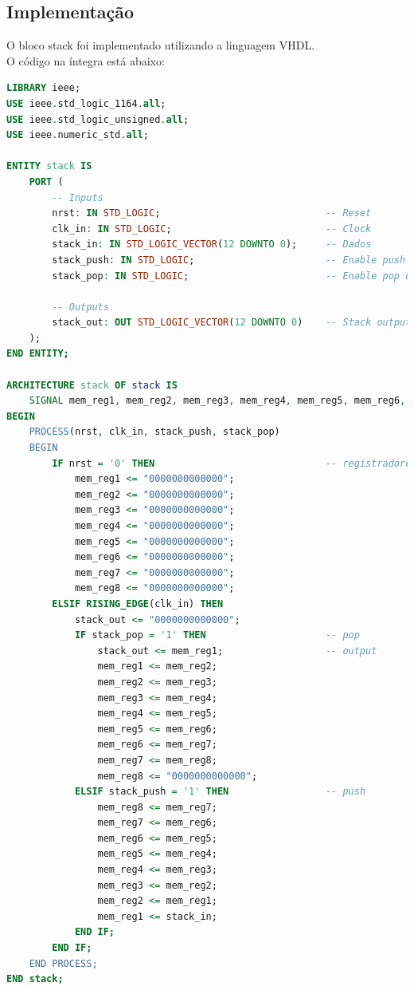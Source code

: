 \documentclass{article}
\begin{document}
\subsection{Implementação}

O bloco stack foi implementado utilizando a linguagem VHDL.\\

O código na íntegra está abaixo:\\

\begin{lstlisting}[language=VHDL, caption={Código VHDL stack}]
LIBRARY ieee;
USE ieee.std_logic_1164.all;
USE ieee.std_logic_unsigned.all;
USE ieee.numeric_std.all;

ENTITY stack IS
    PORT (
        -- Inputs
        nrst: IN STD_LOGIC;                             -- Reset
        clk_in: IN STD_LOGIC;                           -- Clock
        stack_in: IN STD_LOGIC_VECTOR(12 DOWNTO 0);     -- Dados
        stack_push: IN STD_LOGIC;                       -- Enable push op
        stack_pop: IN STD_LOGIC;                        -- Enable pop op
        
        -- Outputs
        stack_out: OUT STD_LOGIC_VECTOR(12 DOWNTO 0)    -- Stack output
    );
END ENTITY;

ARCHITECTURE stack OF stack IS
    SIGNAL mem_reg1, mem_reg2, mem_reg3, mem_reg4, mem_reg5, mem_reg6, mem_reg7, mem_reg8 : STD_LOGIC_VECTOR(12 DOWNTO 0);
BEGIN
    PROCESS(nrst, clk_in, stack_push, stack_pop)
    BEGIN
        IF nrst = '0' THEN                              -- registradores
            mem_reg1 <= "0000000000000";
            mem_reg2 <= "0000000000000";
            mem_reg3 <= "0000000000000";
            mem_reg4 <= "0000000000000";
            mem_reg5 <= "0000000000000";
            mem_reg6 <= "0000000000000";
            mem_reg7 <= "0000000000000";
            mem_reg8 <= "0000000000000";
        ELSIF RISING_EDGE(clk_in) THEN
			stack_out <= "0000000000000";
            IF stack_pop = '1' THEN                     -- pop
                stack_out <= mem_reg1;                  -- output
                mem_reg1 <= mem_reg2;
                mem_reg2 <= mem_reg3;
                mem_reg3 <= mem_reg4;
                mem_reg4 <= mem_reg5;
                mem_reg5 <= mem_reg6;
                mem_reg6 <= mem_reg7;
                mem_reg7 <= mem_reg8;
                mem_reg8 <= "0000000000000";
            ELSIF stack_push = '1' THEN                 -- push
                mem_reg8 <= mem_reg7;
                mem_reg7 <= mem_reg6;
                mem_reg6 <= mem_reg5;
                mem_reg5 <= mem_reg4;
                mem_reg4 <= mem_reg3;
                mem_reg3 <= mem_reg2;
                mem_reg2 <= mem_reg1;
                mem_reg1 <= stack_in; 
            END IF;
        END IF;
    END PROCESS;
END stack;
\end{lstlisting}
\end{document}
